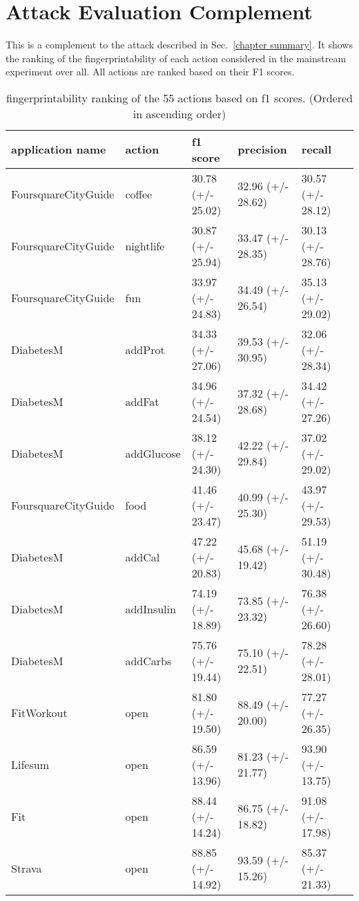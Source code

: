 
\chapter{Attack Evaluation Complement}
This is a complement to the attack described in Sec.~\ref{chapter summary}. It shows the ranking of the fingerprintability of each action considered in the mainstream experiment over all. All actions are ranked based on their F1 scores.
\\




\begin{table}[ht]
\centering
\caption{fingerprintability ranking of the 55 actions based on f1 scores. (Ordered in ascending order)}
    \label{tab:attack ranking}
 \begin{tabular}{llllll} 
 \toprule
 application name & action & f1 score & precision & recall \\ [0.5ex] 
 \midrule
FoursquareCityGuide & coffee & 30.78 (+/- 25.02) & 32.96 (+/- 28.62) & 30.57 (+/- 28.12)\\
FoursquareCityGuide & nightlife & 30.87 (+/- 25.94) & 33.47 (+/- 28.35) & 30.13 (+/- 28.76)\\
FoursquareCityGuide & fun & 33.97 (+/- 24.83) & 34.49 (+/- 26.54) & 35.13 (+/- 29.02)\\
DiabetesM & addProt & 34.33 (+/- 27.06) & 39.53 (+/- 30.95) & 32.06 (+/- 28.34)\\
DiabetesM & addFat & 34.96 (+/- 24.54) & 37.32 (+/- 28.68) & 34.42 (+/- 27.26)\\
DiabetesM & addGlucose & 38.12 (+/- 24.30) & 42.22 (+/- 29.84) & 37.02 (+/- 29.02)\\
FoursquareCityGuide & food & 41.46 (+/- 23.47) & 40.99 (+/- 25.30) & 43.97 (+/- 29.53)\\
DiabetesM & addCal & 47.22 (+/- 20.83) & 45.68 (+/- 19.42) & 51.19 (+/- 30.48)\\
DiabetesM & addInsulin & 74.19 (+/- 18.89) & 73.85 (+/- 23.32) & 76.38 (+/- 26.60)\\
DiabetesM & addCarbs & 75.76 (+/- 19.44) & 75.10 (+/- 22.51) & 78.28 (+/- 28.01)\\
FitWorkout & open & 81.80 (+/- 19.50) & 88.49 (+/- 20.00) & 77.27 (+/- 26.35)\\
Lifesum & open & 86.59 (+/- 13.96) & 81.23 (+/- 21.77) & 93.90 (+/- 13.75)\\
Fit & open & 88.44 (+/- 14.24) & 86.75 (+/- 18.82) & 91.08 (+/- 17.98)\\
Strava & open & 88.85 (+/- 14.92) & 93.59 (+/- 15.26) & 85.37 (+/- 21.33)\\

\end{tabular}
\end{table}

